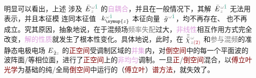 明显可以看出，上述  涉及 $\xint{\mathcolor{gray}{-}}{255}{\bar{E}}^{\;\! \mathcolor{gray}{\omega} \textcolor{PineGreen}{\hat{1}}}_{\;\! \mathcolor{gray}{z}}$ 的\textcolor{Plum}{自耦合}，并且在一般情况下，其解 $\xint{\mathcolor{gray}{-}}{255}{\bar{E}}^{\;\! \mathcolor{gray}{\omega} \textcolor{PineGreen}{\hat{1}}}_{\;\! \mathcolor{gray}{z}}$ 无法用  表示，并且\textcolor{PineGreen}{本征模}  连同\textcolor{PineGreen}{本征值} $\xint{\begin{smallmatrix} ~ \\ {}^{}_{\mathcolor{gray}{-}} \\ ~ \end{smallmatrix}}{15}{k}_{\symup{z}}^{\;\! \mathcolor{gray}{\omega} \textcolor{PineGreen}{\hat{1}}}$ \textcolor{PineGreen}{本征向量} $\xint{{}^{}_{\mathcolor{gray}{-}}}{10}{\bar{g}}^{\;\!\mathcolor{gray}{\omega} \textcolor{PineGreen}{\hat{1}}}$，均不再存在、 也不再成立。究其原因，抽象地说，在于\textcolor{NavyBlue}{混频场}\textcolor{gray}{频率失配}过大，\textcolor{Plum}{非线性}相互作用方式完全改变，\textcolor{Plum}{解的性质}就发生了根本性变化。具体地说，此时，在 $\bar{\bar{\bar{\chi}}}^{\;\! \mathcolor{gray}{\omega} }_{\;\! \mathcolor{gray}{z} \textcolor{Maroon}{(2)}}$ 和\textcolor{gray}{参与混频}的\textcolor{NavyBlue}{准静态}电极电场 ${E}_{\;\! \hat{2} \mathcolor{gray}{z}}$ 的\textcolor{Maroon}{正空间}\textcolor{NavyBlue}{受调制区域}的\textcolor{Plum}{并集}内，对\textcolor{Maroon}{倒空间}中的每一个\textcolor{PineGreen}{平面波}的\textcolor{PineGreen}{波阵面}/\textcolor{PineGreen}{等相位面}，进行了\textcolor{Maroon}{正空间}上的\textcolor{Plum}{非均匀}\textcolor{NavyBlue}{调制}。一旦\textcolor{Maroon}{正}/\textcolor{Maroon}{倒空间}混合，以\textcolor{Maroon}{傅立叶光学}为基础的纯/全局\textcolor{Maroon}{倒空间}中运行的（\textcolor{Maroon}{傅立叶}）\textcolor{Maroon}{谱方法}，就失效了。

